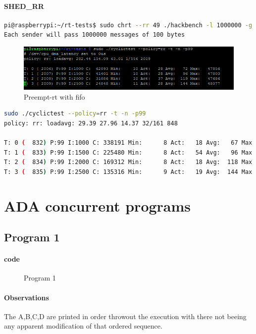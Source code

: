\documentclass[10pt,a4paper]{article}
\begin{document}
\paragraph{SHED\_RR}
\begin{lstlisting}[language=bash,caption={Hackbench with shed\_rr and priority 49}]
pi@raspberrypi:~/rt-tests$ sudo chrt --rr 49 ./hackbench -l 1000000 -g 1q                     
Each sender will pass 1000000 messages of 100 bytes
\end{lstlisting}
\begin{figure}[H]
\includegraphics[width=16cm]{Preempt-RR-WithHackbench.png}
\caption{Preempt-rt with fifo}
\end{figure}
\begin{lstlisting}[language=bash,caption={Volontary kernel}]
sudo ./cyclictest --policy=rr -t -n -p99
policy: rr: loadavg: 29.39 27.96 14.37 32/161 848          

T: 0 (  832) P:99 I:1000 C: 338191 Min:      8 Act:   18 Avg:   67 Max:   49660
T: 1 (  833) P:99 I:1500 C: 225480 Min:      8 Act:   54 Avg:   96 Max:   49563
T: 2 (  834) P:99 I:2000 C: 169312 Min:      8 Act:   18 Avg:  118 Max:   49511
T: 3 (  835) P:99 I:2500 C: 135316 Min:      9 Act:   19 Avg:  144 Max:   47964
\end{lstlisting}
\section{ADA concurrent programs}
\subsection{Program 1}
\paragraph{code}
\begin{figure}[H]
\begin{center}

\caption{Program 1}
\end{center}

\end{figure}

\paragraph{Observations}
The A,B,C,D are printed in order throwout the execution with there not beeing any apparent modification of that ordered sequence.
\end{document}
